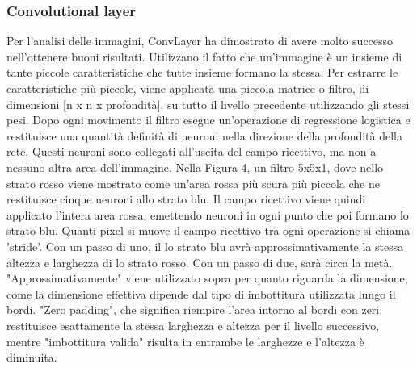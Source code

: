 \documentclass[14pt]{extarticle}
\begin{document}
\subsubsection{Convolutional layer}

Per l'analisi delle immagini, ConvLayer ha dimostrato di avere molto successo
nell'ottenere buoni risultati. Utilizzano il fatto che un'immagine è un insieme di tante piccole  caratteristiche che tutte insieme formano la stessa.
 Per estrarre le caratteristiche più piccole, viene applicata  una piccola matrice o filtro, di dimensioni
[n x n x profondità], su tutto il livello precedente
utilizzando gli stessi pesi. Dopo ogni movimento il filtro esegue un'operazione di regressione logistica e restituisce una quantità definità di neuroni nella direzione della profondità della rete. Questi  neuroni sono collegati all'uscita del campo ricettivo, ma non a nessuno
altra area dell'immagine. Nella Figura 4, un filtro 5x5x1,  dove nello strato rosso viene mostrato come un'area rossa più scura più piccola che ne restituisce cinque
neuroni allo strato blu. Il campo ricettivo viene quindi applicato
l'intera area rossa, emettendo neuroni in ogni punto che poi
formano lo strato blu. Quanti pixel si muove il campo ricettivo
tra ogni operazione si chiama 'stride'. Con un passo di uno, il
lo strato blu avrà approssimativamente la stessa altezza e larghezza di
lo strato rosso. Con un passo di due, sarà circa la metà.
"Approssimativamente" viene utilizzato sopra per quanto riguarda la dimensione, come
la dimensione effettiva dipende dal tipo di imbottitura utilizzata lungo il
bordi. "Zero padding", che significa riempire l'area intorno al
bordi con zeri, restituisce esattamente la stessa larghezza e altezza per
il livello successivo, mentre "imbottitura valida" risulta in entrambe le larghezze
e l'altezza è diminuita.
\end{document}
